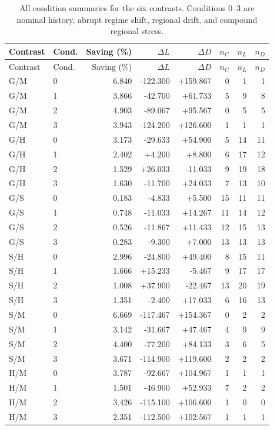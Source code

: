 \documentclass[preprint,12pt]{elsarticle}
\begin{document}
\clearpage
{\small
\setlength{\tabcolsep}{4pt}
\begin{longtable}{llrrrrrr}
\caption{All condition summaries for the six contrasts. Conditions 0--3
are nominal history, abrupt regime shift, regional drift, and compound
regional stress.}\label{tab:conditions}\\
\toprule
Contrast & Cond. & Saving (\%) & $\Delta L$ & $\Delta D$ & $n_C$ & $n_L$ & $n_D$\\
\midrule
\endfirsthead
\toprule
Contrast & Cond. & Saving (\%) & $\Delta L$ & $\Delta D$ & $n_C$ & $n_L$ & $n_D$\\
\midrule
\endhead
\bottomrule
\endfoot
G/M & 0 & 6.840 & -122.300 & +159.867 & 0 & 1 & 1 \\
G/M & 1 & 3.866 & -42.700 & +61.733 & 5 & 9 & 8 \\
G/M & 2 & 4.903 & -89.067 & +95.567 & 0 & 5 & 5 \\
G/M & 3 & 3.943 & -124.200 & +126.600 & 1 & 1 & 1 \\
\addlinespace
G/H & 0 & 3.173 & -29.633 & +54.900 & 5 & 14 & 11 \\
G/H & 1 & 2.402 & +4.200 & +8.800 & 6 & 17 & 12 \\
G/H & 2 & 1.529 & +26.033 & -11.033 & 9 & 19 & 18 \\
G/H & 3 & 1.630 & -11.700 & +24.033 & 7 & 13 & 10 \\
\addlinespace
G/S & 0 & 0.183 & -4.833 & +5.500 & 15 & 11 & 11 \\
G/S & 1 & 0.748 & -11.033 & +14.267 & 11 & 14 & 12 \\
G/S & 2 & 0.526 & -11.867 & +11.433 & 12 & 15 & 13 \\
G/S & 3 & 0.283 & -9.300 & +7.000 & 13 & 13 & 13 \\
\addlinespace
S/H & 0 & 2.996 & -24.800 & +49.400 & 8 & 15 & 11 \\
S/H & 1 & 1.666 & +15.233 & -5.467 & 9 & 17 & 17 \\
S/H & 2 & 1.008 & +37.900 & -22.467 & 13 & 20 & 19 \\
S/H & 3 & 1.351 & -2.400 & +17.033 & 6 & 16 & 13 \\
\addlinespace
S/M & 0 & 6.669 & -117.467 & +154.367 & 0 & 2 & 2 \\
S/M & 1 & 3.142 & -31.667 & +47.467 & 4 & 9 & 9 \\
S/M & 2 & 4.400 & -77.200 & +84.133 & 3 & 6 & 5 \\
S/M & 3 & 3.671 & -114.900 & +119.600 & 2 & 2 & 2 \\
\addlinespace
H/M & 0 & 3.787 & -92.667 & +104.967 & 1 & 1 & 1 \\
H/M & 1 & 1.501 & -46.900 & +52.933 & 7 & 2 & 2 \\
H/M & 2 & 3.426 & -115.100 & +106.600 & 1 & 0 & 0 \\
H/M & 3 & 2.351 & -112.500 & +102.567 & 1 & 1 & 1 \\
\end{longtable}
}
\end{document}
